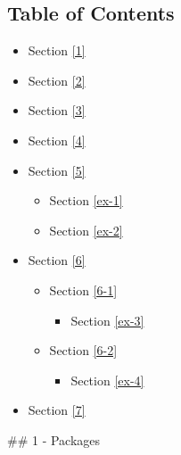 \documentclass[11pt]{article}
\providecommand{\tightlist}{%
      \setlength{\itemsep}{0pt}\setlength{\parskip}{0pt}}
\begin{document}
    \hypertarget{table-of-contents}{%
\subsection{Table of Contents}\label{table-of-contents}}

\begin{itemize}
\tightlist
\item
  Section \ref{1}
\item
  Section \ref{2}
\item
  Section \ref{3}
\item
  Section \ref{4}
\item
  Section \ref{5}

  \begin{itemize}
  \tightlist
  \item
    Section \ref{ex-1}
  \item
    Section \ref{ex-2}
  \end{itemize}
\item
  Section \ref{6}

  \begin{itemize}
  \tightlist
  \item
    Section \ref{6-1}

    \begin{itemize}
    \tightlist
    \item
      Section \ref{ex-3}
    \end{itemize}
  \item
    Section \ref{6-2}

    \begin{itemize}
    \tightlist
    \item
      Section \ref{ex-4}
    \end{itemize}
  \end{itemize}
\item
  Section \ref{7}
\end{itemize}

    \#\# 1 - Packages
\end{document}
